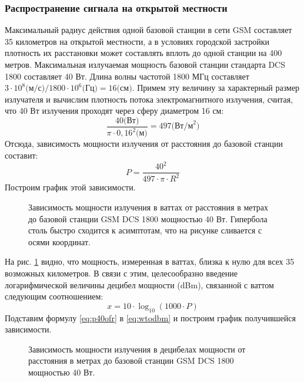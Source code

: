 \subsubsection{Распространение сигнала на открытой местности}
Максимальный радиус действия одной базовой станции в сети GSM составляет 35 километров на открытой местности, а в условиях городской застройки плотность их расстановки может составлять вплоть до одной станции на 400 метров\cite{enwikicellsite}. Максимальная излучаемая мощность базовой станции стандарта DCS 1800 составляет 40 Вт\cite{gsmts}. Длина волны частотой 1800 МГц составляет $3\cdot10^8\text{(м/с)}/1800\cdot10^6\text{(Гц)} = 16\text{(см)}$. Примем эту величину за характерный размер излучателя и вычислим плотность потока электромагнитного излучения, считая, что 40 Вт излучения проходят через сферу диаметром 16 см:
\begin{equation}
	\label{eq:40wdensity}
	\frac{40\text{(Вт)}}{\pi\cdot0,16^2\text{(м)}} = 497\text{(Вт/м}^2\text{)}
\end{equation}
Отсюда, зависимость мощности излучения от расстояния до базовой станции составит:
\begin{equation}
	\label{eq:p40ofr}
	P = \frac{40^2}{497\cdot{}\pi{}\cdot{}R^2}
\end{equation}
Построим график этой зависимости.

\begin{figure}[h]
	\caption{Зависимость мощности излучения в ваттах от расстояния в метрах до базовой станции GSM DCS 1800 мощностью 40 Вт. Гипербола столь быстро сходится к асимптотам, что на рисунке сливается с осями координат.}
	\label{fig:bs40wp}
\end{figure}

На рис. \ref{fig:bs40wp} видно, что мощность, измеренная в ваттах, близка к нулю для всех 35 возможных километров. В связи с этим, целесообразно введение логарифмической величины децибел мощности (dBm), связанной с ваттом следующим соотношением\cite{enwikidbm}:
\begin{equation}
	\label{eq:wtodbm}
	x = 10\cdot{}\log_{10}(1000\cdot{}P)
\end{equation}
Подставим формулу \ref{eq:p40ofr} в \ref{eq:wtodbm} и построим график получившейся зависимости.

\begin{figure}[h]
	\caption{Зависимость мощности излучения в децибелах мощности от расстояния в метрах до базовой станции GSM DCS 1800 мощностью 40 Вт.}
	\label{fig:bs40wdbm}
\end{figure}

